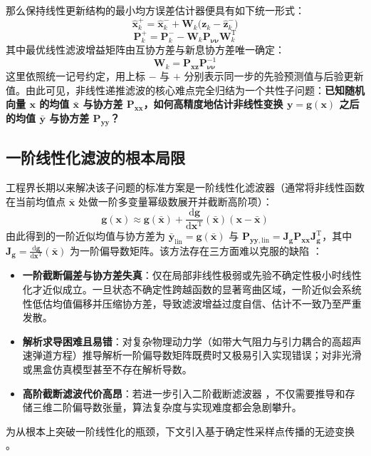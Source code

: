 那么保持线性更新结构的最小均方误差估计器便具有如下统一形式：
\begin{equation}\label{eq:3}
\hat{\bm{x}}_k^{+} = \hat{\bm{x}}_k^{-} + \bm{W}_k \bigl(\bm{z}_k - \hat{\bm{z}}_k^{-}\bigr)
\end{equation}
\begin{equation}\label{eq:4}
\bm{P}_k^{+} = \bm{P}_k^{-} - \bm{W}_k \bm{P}_{\bm{\nu}\bm{\nu}} \bm{W}_k^{\mathrm{T}}
\end{equation}
其中最优线性滤波增益矩阵由互协方差与新息协方差唯一确定：
\begin{equation}\label{eq:5}
\bm{W}_k = \bm{P}_{\bm{x}\bm{z}} \bm{P}_{\bm{\nu}\bm{\nu}}^{-1}
\end{equation}
这里依照统一记号约定，用上标 $-$ 与 $+$ 分别表示同一步的先验预测值与后验更新值。由此可见，非线性递推滤波的核心难点完全归结为一个共性子问题：\textbf{已知随机向量 $\bm{x}$ 的均值 $\bar{\bm{x}}$ 与协方差 $\bm{P}_{\bm{x}\bm{x}}$，如何高精度地估计非线性变换 $\bm{y} = \bm{g}(\bm{x})$ 之后的均值 $\bar{\bm{y}}$ 与协方差 $\bm{P}_{\bm{y}\bm{y}}$？}

\subsection{一阶线性化滤波的根本局限}\label{sec:ekf-limits}

工程界长期以来解决该子问题的标准方案是一阶线性化滤波器（通常将非线性函数在当前均值点 $\bar{\bm{x}}$ 处做一阶多变量幂级数展开并截断高阶项）：
\begin{equation}\label{eq:6}
\bm{g}(\bm{x}) \approx \bm{g}(\bar{\bm{x}}) + \frac{\mathrm{d}\bm{g}}{\mathrm{d}\bm{x}^{\mathrm{T}}}(\bar{\bm{x}})(\bm{x} - \bar{\bm{x}})
\end{equation}
由此得到的一阶近似均值与协方差为 $\bar{\bm{y}}_{\text{lin}} = \bm{g}(\bar{\bm{x}})$ 与 $\bm{P}_{\bm{y}\bm{y},\text{lin}} = \bm{J}_{\bm{g}} \bm{P}_{\bm{x}\bm{x}} \bm{J}_{\bm{g}}^{\mathrm{T}}$，其中 $\bm{J}_{\bm{g}} = \frac{\mathrm{d}\bm{g}}{\mathrm{d}\bm{x}^{\mathrm{T}}}(\bar{\bm{x}})$ 为一阶偏导数矩阵。该方法存在三方面难以克服的缺陷 \cite{r04,r05}：

\begin{itemize}
\item \textbf{一阶截断偏差与协方差失真}：仅在局部非线性极弱或先验不确定性极小时线性化才近似成立。一旦状态不确定性跨越函数的显著弯曲区域，一阶近似会系统性低估均值偏移并压缩协方差，导致滤波增益过度自信、估计不一致乃至严重发散。
\item \textbf{解析求导困难且易错}：对复杂物理动力学（如带大气阻力与引力耦合的高超声速弹道方程）推导解析一阶偏导数矩阵既费时又极易引入实现错误；对非光滑或黑盒仿真模型甚至不存在解析导数。
\item \textbf{高阶截断滤波代价高昂}：若进一步引入二阶截断滤波器 \cite{r05}，不仅需要推导和存储三维二阶偏导数张量，算法复杂度与实现难度都会急剧攀升。
\end{itemize}

为从根本上突破一阶线性化的瓶颈，下文引入基于确定性采样点传播的无迹变换 \cite{r04,r08}。
